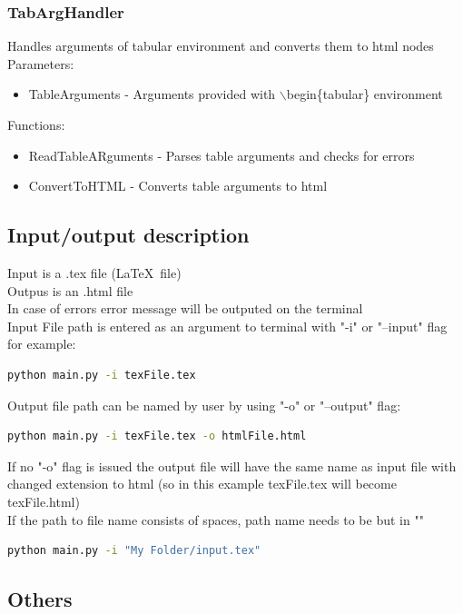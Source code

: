 \subsubsection{TabArgHandler}
Handles arguments of tabular environment and converts them to html nodes  \\ 
Parameters: \\ 
\begin{itemize}
\item TableArguments - Arguments provided with $\backslash$begin\{tabular\} environment
\end{itemize}
Functions: 
\begin{itemize}
    \item ReadTableARguments - Parses table arguments and checks for errors 
    \item ConvertToHTML - Converts table arguments to html
\end{itemize}

\subsection{Input/output description}
Input is a .tex file (\LaTeX \, file) \\ 
Outpus is an .html file \\ 
In case of errors error message will be outputed on the terminal \\
Input File path is entered as an argument to terminal with "-i" or "--input" flag for example:
\begin{lstlisting}[language=bash]
python main.py -i texFile.tex
\end{lstlisting}
Output file path can be named by user by using "-o" or "--output" flag:
\begin{lstlisting}[language=bash]
python main.py -i texFile.tex -o htmlFile.html
\end{lstlisting}
If no "-o" flag is issued the output file will have the same name as input file with changed extension to html (so in this example texFile.tex will become texFile.html) \\ 
If the path to file name consists of spaces, path name needs to be but in ""
\begin{lstlisting}[language=bash]
python main.py -i "My Folder/input.tex"
\end{lstlisting}
\subsection{Others}
